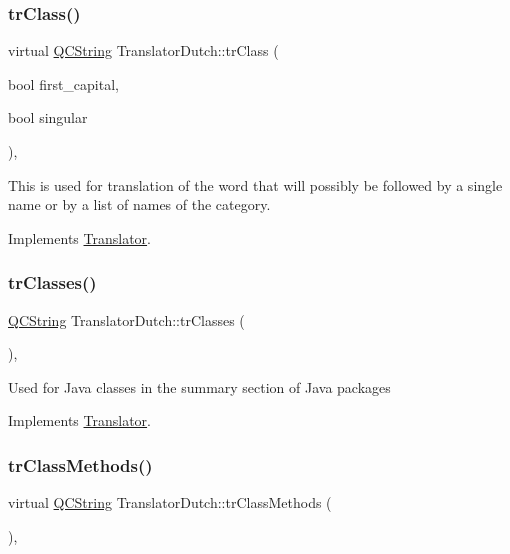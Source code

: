 \subsubsection{\texorpdfstring{trClass()}{trClass()}}
{\footnotesize\ttfamily virtual \mbox{\hyperlink{class_q_c_string}{Q\+C\+String}} Translator\+Dutch\+::tr\+Class (\begin{DoxyParamCaption}\item[{bool}]{first\+\_\+capital,  }\item[{bool}]{singular }\end{DoxyParamCaption})\hspace{0.3cm}{\ttfamily [inline]}, {\ttfamily [virtual]}}

This is used for translation of the word that will possibly be followed by a single name or by a list of names of the category. 

Implements \mbox{\hyperlink{class_translator}{Translator}}.

\mbox{\label{class_translator_dutch_aa31c2428cf745783fb68b73ad270dc58}} 
\subsubsection{\texorpdfstring{trClasses()}{trClasses()}}
{\footnotesize\ttfamily \mbox{\hyperlink{class_q_c_string}{Q\+C\+String}} Translator\+Dutch\+::tr\+Classes (\begin{DoxyParamCaption}{ }\end{DoxyParamCaption})\hspace{0.3cm}{\ttfamily [inline]}, {\ttfamily [virtual]}}

Used for Java classes in the summary section of Java packages 

Implements \mbox{\hyperlink{class_translator}{Translator}}.

\mbox{\label{class_translator_dutch_ab39d6fb44c4108793cf1a87900ab9aae}} 
\subsubsection{\texorpdfstring{trClassMethods()}{trClassMethods()}}
{\footnotesize\ttfamily virtual \mbox{\hyperlink{class_q_c_string}{Q\+C\+String}} Translator\+Dutch\+::tr\+Class\+Methods (\begin{DoxyParamCaption}{ }\end{DoxyParamCaption})\hspace{0.3cm}{\ttfamily [inline]}, {\ttfamily [virtual]}}

